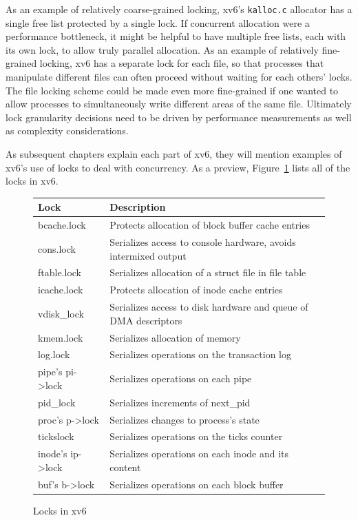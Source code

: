 As an example of relatively coarse-grained locking, xv6's
\lstinline{kalloc.c}
allocator has a single free list protected by a single
lock. If concurrent allocation were a performance bottleneck,
it might be helpful to have multiple free lists, each with
its own lock, to allow truly parallel allocation.
As an example of relatively fine-grained locking, xv6
has a separate lock for each file, so that processes that
manipulate different files can often proceed without waiting
for each others' locks. The file locking
scheme could be made even more fine-grained if one wanted
to allow processes to simultaneously
write different areas of the same file.
Ultimately lock granularity decisions need to be driven
by performance measurements as well as complexity considerations.

As subsequent chapters explain each part of xv6, they
will mention examples of xv6's use of locks
to deal with concurrency.
As a preview,
Figure~\ref{fig:locktable}
lists all of the locks in xv6.

\begin{figure}[t]
\center
\begin{tabular}{ll}
{\bf Lock} & {\bf Description} \\
\midrule
bcache.lock & Protects allocation of block buffer cache entries \\
cons.lock & Serializes access to console hardware, avoids intermixed output \\
ftable.lock & Serializes allocation of a struct file in file table \\
icache.lock & Protects allocation of inode cache entries \\
vdisk\_lock & Serializes access to disk hardware and queue of DMA descriptors \\
kmem.lock & Serializes allocation of memory \\
log.lock & Serializes operations on the transaction log \\
pipe's pi->lock & Serializes operations on each pipe \\
pid\_lock & Serializes increments of next\_pid \\
proc's p->lock & Serializes changes to process's state \\
tickslock & Serializes operations on the ticks counter \\
inode's ip->lock & Serializes operations on each inode and its content \\
buf's b->lock & Serializes operations on each block buffer \\
\end{tabular}
\caption{Locks in xv6}
\label{fig:locktable}
\end{figure}
